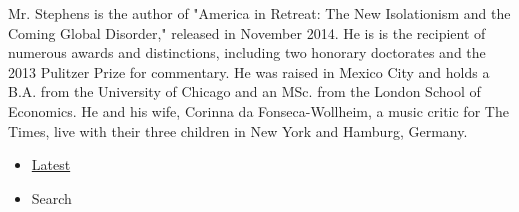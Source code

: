 Mr. Stephens is the author of "America in Retreat: The New Isolationism
and the Coming Global Disorder," released in November 2014. He is is the
recipient of numerous awards and distinctions, including two honorary
doctorates and the 2013 Pulitzer Prize for commentary. He was raised in
Mexico City and holds a B.A. from the University of Chicago and an MSc.
from the London School of Economics. He and his wife, Corinna da
Fonseca-Wollheim, a music critic for The Times, live with their three
children in New York and Hamburg, Germany.

\begin{itemize}
\tightlist
\item
  \protect\hyperlink{stream-panel}{Latest}
\item
  Search
\end{itemize}

